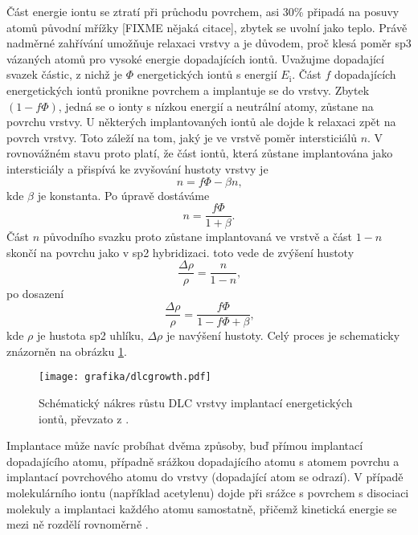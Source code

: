 Část energie iontu se ztratí při průchodu povrchem, asi 30\% připadá na posuvy atomů původní mřížky [FIXME nějaká citace], zbytek se uvolní jako teplo. Právě nadměrné zahřívání umožňuje relaxaci vrstvy a je důvodem, proč klesá poměr sp3 vázaných atomů pro vysoké energie dopadajících iontů. Uvažujme dopadající svazek částic, z nichž je $\Phi$ energetických iontů s energií $E_\mathrm{i}$. Část $f$ dopadajících energetických iontů pronikne povrchem a implantuje se do vrstvy. Zbytek $(1-f \Phi)$, jedná se o ionty s nízkou energií a neutrální atomy, zůstane na povrchu vrstvy. U některých implantovaných iontů ale dojde k relaxaci zpět na povrch vrstvy. Toto záleží na tom, jaký je ve vrstvě poměr intersticiálů $n$. V rovnovážném stavu proto platí, že část iontů, která zůstane implantována jako intersticiály a přispívá ke zvyšování hustoty vrstvy je 
\begin{equation}
n = f \Phi - \beta n \text{,}
\end{equation}
kde $\beta$ je konstanta. Po úpravě dostáváme
\begin{equation}
n = \frac{f \Phi}{1 + \beta} \text{.}
\end{equation} 
Část $n$ původního svazku proto zůstane implantovaná ve vrstvě a část $1-n$ skončí na povrchu jako v sp2 hybridizaci. toto vede de zvýšení hustoty
\begin{equation}
\frac{\Delta \rho}{\rho} = \frac{n}{1-n} \text{,}
\end{equation}  
po dosazení
\begin{equation}
\frac{\Delta \rho}{\rho} = \frac{f \Phi}{1 - f \Phi + \beta} \text{,}
\end{equation}
kde $\rho$ je hustota sp2 uhlíku, $\Delta \rho$ je navýšení hustoty. Celý proces je schematicky znázorněn na obrázku \ref{dlcgrowth}.

\begin{figure}[htbp]
  \centering
  \texttt{[image: grafika/dlcgrowth.pdf]}
  \caption{Schématický nákres růstu DLC vrstvy implantací energetických iontů, převzato z \cite{Robertson2002}.}
  \label{dlcgrowth}
\end{figure}

Implantace může navíc probíhat dvěma způsoby, buď přímou implantací dopadajícího atomu, případně srážkou dopadajícího atomu s atomem povrchu a implantací povrchového atomu do vrstvy (dopadající atom se odrazí). V případě molekulárního iontu (například acetylenu) dojde při srážce s povrchem s disociaci molekuly a implantaci každého atomu samostatně, přičemž kinetická energie se mezi ně rozdělí rovnoměrně \cite{Robertson2002}.


